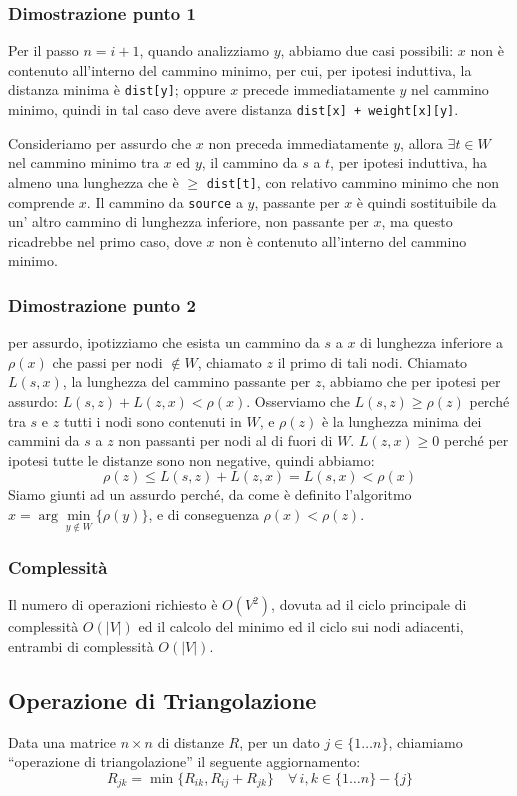 \documentclass[../template]{subfiles}
\begin{document}
\subsubsection{Dimostrazione punto 1}
Per il passo $n = i+1$, quando analizziamo $y$, abbiamo due casi possibili:
$x$ non è contenuto all'interno del cammino minimo, per cui, per ipotesi induttiva, la distanza minima è \lstinline{dist[y]};
oppure $x$ precede immediatamente $y$ nel cammino minimo, quindi in tal caso deve avere distanza \lstinline{dist[x] + weight[x][y]}.

Consideriamo per assurdo che $x$ non preceda immediatamente $y$, allora $\exists t \in W$ nel cammino minimo tra $x$ ed $y$,
il cammino da $s$ a $t$, per ipotesi induttiva, ha almeno una lunghezza che è $\ge$ \lstinline{dist[t]}, con relativo cammino minimo
che non comprende $x$.
Il cammino da \lstinline{source} a $y$, passante per $x$ è quindi sostituibile da un' altro cammino di lunghezza inferiore, non passante
per $x$, ma questo ricadrebbe nel primo caso, dove $x$ non è contenuto all'interno del cammino minimo.

\subsubsection{Dimostrazione punto 2}
per assurdo, ipotizziamo che esista un cammino da $s$ a $x$ di lunghezza inferiore a $\rho(x)$ che passi per nodi $\notin W$, chiamato $z$
il primo di tali nodi.
Chiamato $L(s, x)$, la lunghezza del cammino passante per $z$, abbiamo che per ipotesi per assurdo: $L(s, z) + L(z, x) < \rho(x)$.
Osserviamo che $L(s, z) \ge \rho(z)$ perché tra $s$ e $z$ tutti i nodi sono contenuti in $W$, e $\rho(z)$ è la lunghezza minima
dei cammini da $s$ a $z$ non passanti per nodi al di fuori di $W$.
$L(z, x) \ge 0$ perché per ipotesi tutte le distanze sono non negative, quindi abbiamo:
\[
    \rho(z) \le L(s, z) + L(z, x) = L(s, x) < \rho(x)
\]
Siamo giunti ad un assurdo perché, da come è definito l'algoritmo $x = \arg\min\limits_{y\notin W}\{\rho(y)\}$, e di
conseguenza $\rho(x) < \rho(z)$.
\subsubsection{Complessità}
Il numero di operazioni richiesto è $O(V^2)$, dovuta ad il ciclo principale di complessità $O(|V|)$ ed il
calcolo del minimo ed il ciclo sui nodi adiacenti, entrambi di complessità $O(|V|)$.

\newpage
\subsection{Operazione di Triangolazione}
Data una matrice $n \times n$ di distanze $R$, per un dato $j \in \{1\ldots n\}$, chiamiamo ``operazione di triangolazione'' il
seguente aggiornamento:
\[
    R_{jk} = \min\big\{R_{ik}, R_{ij} + R_{jk}\big\} \quad \forall\,i, k \in \big\{1\ldots n\big\} - \big\{j\big\}
\]
\end{document}
